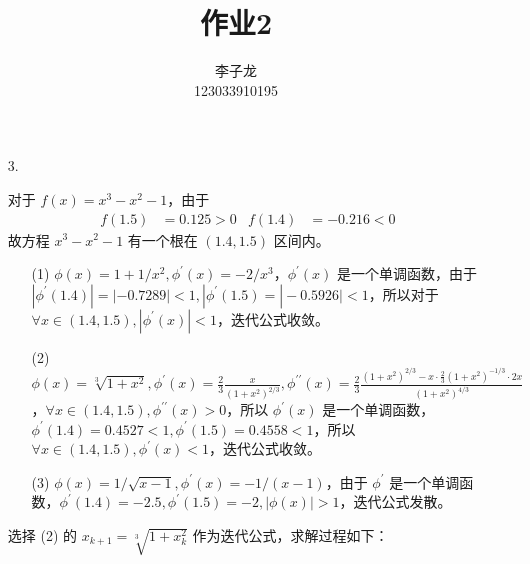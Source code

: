 \documentclass{sjtuarticle}
\title{作业2}
\author{李子龙\\123033910195}
\begin{document}
\maketitle
\begin{itemize}
    \item[3.] \begin{solution}
        对于 $f(x)=x^3-x^2-1$，由于
    \begin{align*}
        f(1.5)&=0.125>0 & f(1.4)&=-0.216<0 
    \end{align*}
    故方程 $x^3-x^2-1$ 有一个根在 $(1.4,1.5)$ 区间内。
    \begin{itemize}
        \item[(1)] $\phi(x)=1+1/x^2,\phi^\prime(x)=-2/x^3$，$\phi^\prime(x)$ 是一个单调函数，由于 $|\phi^\prime(1.4)|=|-0.7289|<1,|\phi^\prime(1.5)=|-0.5926|<1$，所以对于 $\forall x \in (1.4,1.5), |\phi^\prime(x)|<1$，迭代公式收敛。
        \item[(2)] $\phi(x)=\sqrt[3]{1+x^2},\phi^\prime(x)=\frac{2}{3}\frac{x}{(1+x^2)^{2/3}},\phi^{\prime\prime}(x)=\frac{2}{3}\frac{(1+x^2)^{2/3}-x\cdot\frac{2}{3}(1+x^2)^{-1/3}\cdot 2x}{(1+x^2)^{4/3}}$，$\forall x\in(1.4,1.5),\phi^{\prime\prime}(x)>0$，所以 $\phi^\prime(x)$ 是一个单调函数，$\phi^\prime(1.4)=0.4527<1,\phi^\prime(1.5)=0.4558<1$，所以 $\forall x\in (1.4,1.5), \phi^\prime(x)<1$，迭代公式收敛。
        \item[(3)] $\phi(x)=1/\sqrt{x-1},\phi^\prime(x)=-1/(x-1)$，由于 $\phi^\prime$ 是一个单调函数，$\phi^\prime(1.4)=-2.5,\phi^\prime(1.5)=-2,|\phi(x)|>1$，迭代公式发散。
    \end{itemize}
    选择 (2) 的 $x_{k+1}=\sqrt[3]{1+x_k^2}$ 作为迭代公式，求解过程如下：



\end{solution}
\end{itemize}
\end{document}
